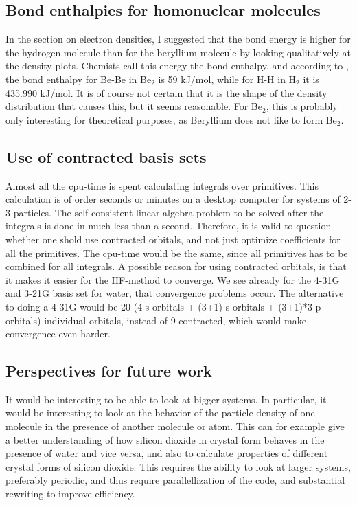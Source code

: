 \documentclass[a4paper,10pt, twocolumn, pre]{revtex4}
\begin{document}
\subsection{Bond enthalpies for homonuclear molecules}
In the section on electron densities, I suggested that the bond energy is higher for the hydrogen molecule than for the beryllium molecule by looking qualitatively at the density plots. Chemists call this energy the bond enthalpy, and according to \cite{lide2004crc}, the bond enthalpy for Be-Be in Be$_2$ is 59 kJ/mol, while for H-H in H$_2$ it is 435.990 kJ/mol. It is of course not certain that it is the shape of the density distribution that causes this, but it seems reasonable. For Be$_2$, this is probably only interesting for theoretical purposes, as Beryllium does not like to form Be$_2$.

\subsection{Use of contracted basis sets}
Almost all the cpu-time is spent calculating integrals over primitives. This calculation is of order seconds or minutes on a desktop computer for systems of 2-3 particles. The self-consistent linear algebra problem to be solved after the integrals is done in much less than a second. Therefore, it is valid to question whether one shold use contracted orbitals, and not just optimize coefficients for all the primitives. The cpu-time would be the same, since all primitives has to be combined for all integrals. A possible reason for using contracted orbitals, is that it makes it easier for the HF-method to converge. We see already for the 4-31G and 3-21G basis set for water, that convergence problems occur. The alternative to doing a 4-31G would be 20 (4 s-orbitals + (3+1) s-orbitals + (3+1)*3 p-orbitals) individual orbitals, instead of 9 contracted, which would make convergence even harder. 


\subsection{Perspectives for future work}
It would be interesting to be able to look at bigger systems. In particular, it would be interesting to look at the behavior of the particle density of one molecule in the presence of another molecule or atom. This can for example give a better understanding of how silicon dioxide in crystal form behaves in the presence of water and vice versa, and also to calculate properties of different crystal forms of silicon dioxide. This requires the ability to look at larger systems, preferably periodic, and thus require parallellization of the code, and substantial rewriting to improve efficiency. 
\end{document}
